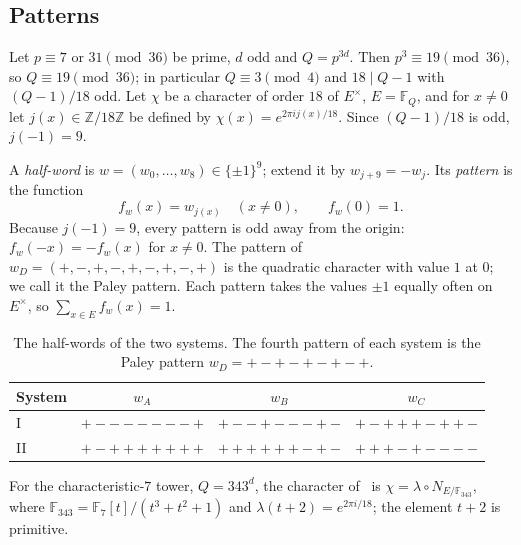 \documentclass[11pt]{article}
\theoremstyle{plain}
\theoremstyle{definition}
\theoremstyle{remark}
\newcommand{\F}{\mathbb F}
\newcommand{\Z}{\mathbb Z}
\begin{document}
\subsection{Patterns}
Let $p\equiv7$ or $31\pmod{36}$ be prime, $d$ odd and $Q=p^{3d}$. Then
$p^3\equiv19\pmod{36}$, so $Q\equiv19\pmod{36}$; in particular
$Q\equiv3\pmod4$ and $18\mid Q-1$ with $(Q-1)/18$ odd. Let $\chi$ be a
character of order $18$ of $E^\times$, $E=\F_Q$, and for $x\neq0$ let
$j(x)\in\Z/18\Z$ be defined by $\chi(x)=e^{2\pi ij(x)/18}$. Since
$(Q-1)/18$ is odd, $j(-1)=9$.

A \emph{half-word} is $w=(w_0,\dots,w_8)\in\{\pm1\}^9$; extend it by
$w_{j+9}=-w_j$. Its \emph{pattern} is the function
\[
 f_w(x)=w_{j(x)}\quad(x\neq0),\qquad f_w(0)=1.
\]
Because $j(-1)=9$, every pattern is odd away from the origin:
$f_w(-x)=-f_w(x)$ for $x\neq0$. The pattern of $w_D=(+,-,+,-,+,-,+,-,+)$ is
the quadratic character with value $1$ at $0$; we call it the Paley pattern.
Each pattern takes the values $\pm1$ equally often on $E^\times$, so
$\sum_{x\in E}f_w(x)=1$.

\begin{table}[ht]
\centering
\begin{tabular}{lccc}
\toprule
System & $w_A$ & $w_B$ & $w_C$\\
\midrule
I  & $+{-}{-}{-}{-}{-}{-}{-}+$ & $+{-}{-}+{-}{-}{-}+{-}$ & $+{-}+++{-}++{-}$\\
II & $+{-}+++++++$ & $++++++{-}+{-}$ & $+++{-}+{-}{-}{-}{-}$\\
\bottomrule
\end{tabular}
\caption{The half-words of the two systems. The fourth pattern of each
system is the Paley pattern $w_D=+{-}+{-}+{-}+{-}+$.}\label{tab:words}
\end{table}

For the characteristic-$7$ tower, $Q=343^d$, the character
of~\cite{Kline18} is $\chi=\lambda\circ N_{E/\F_{343}}$, where
$\F_{343}=\F_7[t]/(t^3+t^2+1)$ and $\lambda(t+2)=e^{2\pi i/18}$; the
element $t+2$ is primitive.
\end{document}

